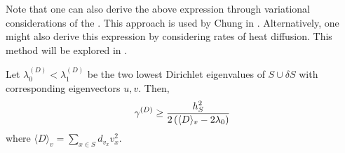   \begin{remark}
    Note that one can also derive the above expression through variational considerations of the . This approach is used by Chung in \cite{Chung}. Alternatively, one might also derive this expression by considering rates of heat diffusion. This method will be explored in .
  \end{remark}
  
  \begin{thm}\label{thm:cheeger}
  	Let $\lambda_0^{(D)} <\lambda_1^{(D)}$ be the two lowest Dirichlet eigenvalues of $S \cup \delta S$ with corresponding eigenvectors $u,v$. Then, 
  	\[
	    \gamma^{(D)} \geq \frac{\displaystyle h_S^2}{\displaystyle 2 \left(\langle D \rangle_v - 2\lambda_0\right)}
	\]
	where $\langle D \rangle_v = \sum_{x \in S} d_{v_x} v_x^2$.
  \end{thm}

